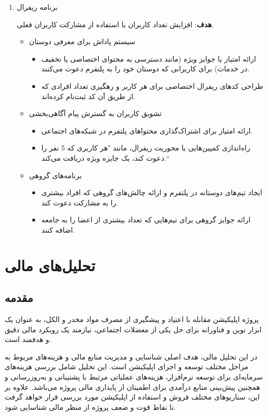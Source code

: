 \documentclass[dvipsnames, svgnames, x11names, 11pt]{article}
\begin{document}
\begin{enumerate}
\item 
برنامه ریفرال   

\textbf{هدف}:
افزایش تعداد کاربران با استفاده از مشارکت کاربران فعلی.  
\begin{itemize}
\item 
سیستم پاداش برای معرفی دوستان
\begin{itemize}
\item 
ارائه امتیاز یا جوایز ویژه (مانند دسترسی به محتوای اختصاصی یا تخفیف در خدمات) برای کاربرانی که دوستان خود را به پلتفرم دعوت می‌کنند.  
\item 
طراحی کدهای ریفرال اختصاصی برای هر کاربر و رهگیری تعداد افرادی که از طریق آن کد ثبت‌نام کرده‌اند.  
\end{itemize}

\item 
تشویق کاربران به گسترش پیام آگاهی‌بخشی
\begin{itemize}
\item 
ارائه امتیاز برای اشتراک‌گذاری محتواهای پلتفرم در شبکه‌های اجتماعی.  
\item 
راه‌اندازی کمپین‌هایی با محوریت ریفرال، مانند "هر کاربری که 5 نفر را دعوت کند، یک جایزه ویژه دریافت می‌کند.``
\end{itemize}

\item 
برنامه‌های گروهی
\begin{itemize}
\item 
ایجاد تیم‌های دوستانه در پلتفرم و ارائه چالش‌های گروهی که افراد بیشتری را به مشارکت دعوت کند.
\item 
ارائه جوایز گروهی برای تیم‌هایی که تعداد بیشتری از اعضا را به جامعه اضافه کنند.
\end{itemize}
\end{itemize}
\end{enumerate}

\section{تحلیل‌های مالی}
\subsection{مقدمه}
پروژه اپلیکیشن مقابله با اعتیاد و پیشگیری از مصرف مواد مخدر و الکل، به عنوان یک ابزار نوین و فناورانه برای حل یکی از معضلات اجتماعی، نیازمند یک رویکرد مالی دقیق و هدفمند است.

در این تحلیل مالی، هدف اصلی شناسایی و مدیریت منابع مالی و هزینه‌های مربوط به مراحل مختلف توسعه و اجرای اپلیکیشن است. این تحلیل شامل بررسی هزینه‌های سرمایه‌ای برای توسعه نرم‌افزار، هزینه‌های عملیاتی مرتبط با پشتیبانی و به‌روزرسانی و همچنین پیش‌بینی منابع درآمدی برای اطمینان از پایداری مالی پروژه می‌باشد. علاوه بر این، سناریوهای مختلف فروش و استفاده از اپلیکیشن مورد بررسی قرار خواهد گرفت تا نقاط قوت و ضعف پروژه از منظر مالی شناسایی شود.
\end{document}
